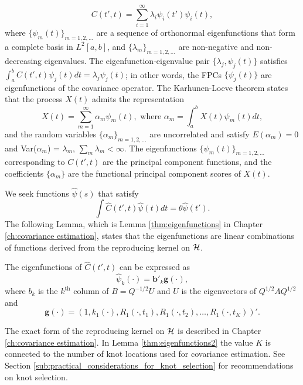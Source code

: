 \begin{equation*}
	C(t',t) = \sum_{i=1}^{\infty}\lambda_i\psi_i(t')\psi_i(t), 
\end{equation*}
where $\{\psi_m(t)\}_{m=1,2,\ldots}$ are a sequence of orthonormal eigenfunctions that form a complete basis in $L^2[a,b]$, and $\{\lambda_m \}_{m=1,2,\ldots}$ are non-negative and non-decreasing eigenvalues. The eigenfunction-eigenvalue pair $\{\lambda_j, \psi_j(t)\}$ satisfies $\int_a^bC(t',t)\psi_j(t)dt = \lambda_j\psi_j(t)$; in other words, the FPCs $\{\psi_j(t)\}$ are eigenfunctions of the covariance operator. The Karhunen-Loeve theorem states that the process $X(t)$ admits the representation 
\begin{equation*}
	X(t) = \sum_{m=1}^{\infty}\alpha_m \psi_m(t), \mbox{ where } \alpha_m = \int_a^b X(t) \psi_m(t)dt, 
\end{equation*}
and the random variables $\{\alpha_m \}_{m=1,2,\ldots}$ are uncorrelated and satisfy $E(\alpha_m)=0$ and Var($\alpha_m$) = $\lambda_m$, $\sum_m \lambda_m < \infty$. The eigenfunctions $\{\psi_m(t)\}_{m=1,2,\ldots}$ corresponding to $C(t',t)$ are the principal component functions, and the coefficients $\{\alpha_m \}$ are the functional principal component scores of $X(t)$.

We seek functions $\hat{\psi}(s)$ that satisfy
\begin{equation}
	\label{eq:eigenfuns} \int \hat{C}(t',t)\hat{\psi}(t)dt=\theta\hat{\psi}(t'). \nonumber
\end{equation}
The following Lemma, which is Lemma \ref{thm:eigenfunctions} in Chapter \ref{ch:covariance estimation}, states that the eigenfunctions are linear combinations of functions derived from the reproducing kernel on $\mathcal{H}$. 
\begin{lemma}
	\label{thm:eigenfunctions2} The eigenfunctions of $\hat{C}(t',t)$ can be expressed as 
	\begin{equation*}
		\hat{\psi}_k(\cdot) = \mathbf{b}'_k\mathbf{g}(\cdot), 
	\end{equation*}
	where $b_k$ is the $k^{\mbox{th}}$ column of $B=Q^{-1/2}U$ and $U$ is the eigenvectors of $Q^{1/2}AQ^{1/2}$ and
	\[ \mathbf{g(\cdot)}=(1, k_1(\cdot),R_{1}(\cdot, t_1),R_{1}(\cdot, t_2),\dots, R_{1}(\cdot, t_K))'. \]
\end{lemma}
The exact form of the reproducing kernel on $\mathcal{H}$ is described in Chapter \ref{ch:covariance estimation}. In Lemma \ref{thm:eigenfunctions2} the value $K$ is connected to the number of knot locations used for covariance estimation. See Section \ref{sub:practical_considerations_for_knot_selection} for recommendations on knot selection.

